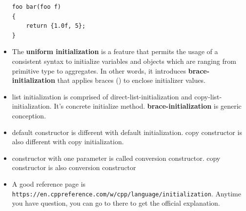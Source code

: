 \documentclass[a4paper,11pt,twoside]{book}
\begin{document}
\begin{itemize}
\begin{lstlisting}[numbers=none]	
foo bar(foo f)
{
	return {1.0f, 5};
}
\end{lstlisting}

	\item The \textbf{uniform initialization} is a feature that permits the usage of a consistent syntax to initialize variables and objects which are ranging from primitive type to aggregates. In other words, it introduces \textbf{brace-initialization} that applies braces ({}) to enclose initializer values.
	
	\item list initialization is comprised of direct-list-initialization and copy-list-initialization. It's concrete initialize method. \textbf{brace-initialization} is generic conception. 
	
	\item default constructor is different with default initialization. copy constructor is also different with copy initialization.
	
	\item constructor with one parameter is called conversion constructor.  copy constructor is also conversion constructor
	
	
	\item A good reference page is \verb|https://en.cppreference.com/w/cpp/language/initialization|. Anytime you have question, you can go to there to get the official explanation. 
\end{itemize}
\end{document}
